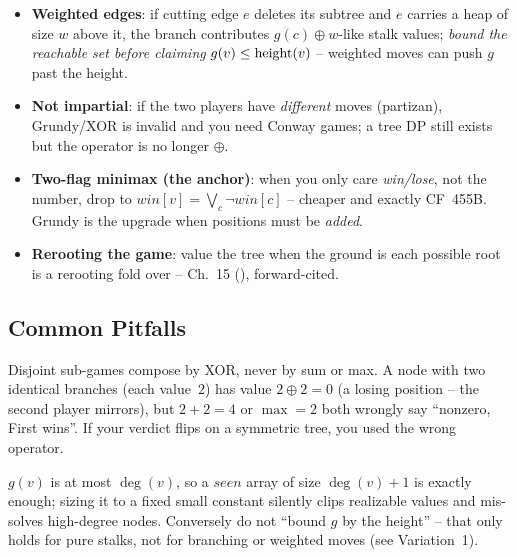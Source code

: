 \begin{itemize}[nosep]
  \item \textbf{Weighted edges}: if cutting edge $e$ deletes its subtree and $e$ carries
        a heap of size $w$ above it, the branch contributes $g(c) \oplus w$-like stalk
        values; \emph{bound the reachable set before claiming} $g(v) \le \operatorname{height}(v)$ --
        weighted moves can push $g$ past the height. \hfill{}
  \item \textbf{Not impartial}: if the two players have \emph{different} moves (partizan),
        Grundy/XOR is invalid and you need Conway games; a tree DP still exists but the
        operator is no longer $\oplus$. \hfill{}
  \item \textbf{Two-flag minimax (the anchor)}: when you only care \emph{win/lose}, not the
        number, drop to $\mathit{win}[v] = \bigvee_c \neg \mathit{win}[c]$ -- cheaper and
        exactly CF~455B. Grundy is the upgrade when positions must be \emph{added}. \hfill{}
  \item \textbf{Rerooting the game}: value the tree when the ground is each possible root is
        a rerooting fold over  -- Ch.~15 (), forward-cited. \hfill{}
\end{itemize}

\subsection{Common Pitfalls}

\begin{warningbox}
Disjoint sub-games compose by XOR, never by sum or max. A node with two identical
branches (each value~$2$) has value $2 \oplus 2 = 0$ (a losing position -- the second
player mirrors), but $2+2=4$ or $\max=2$ both wrongly say ``nonzero, First wins''. If
your verdict flips on a symmetric tree, you used the wrong operator.
\end{warningbox}

\begin{warningbox}
$g(v)$ is at most $\deg(v)$, so a $\mathit{seen}$ array of size $\deg(v)+1$ is exactly
enough; sizing it to a fixed small constant silently clips realizable values and mis-solves
high-degree nodes. Conversely do not ``bound $g$ by the height'' -- that only holds for
pure stalks, not for branching or weighted moves (see Variation~1).
\end{warningbox}

